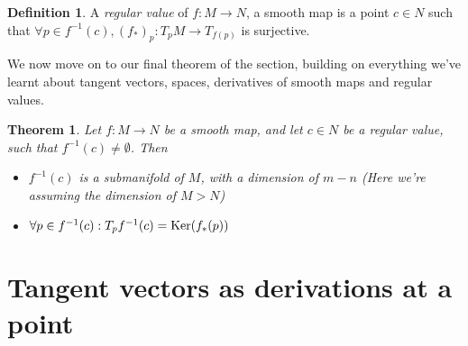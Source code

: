 \documentclass[12pt]{book}
\newtheorem{theorem}{Theorem}[chapter]
\theoremstyle{definition}
\newtheorem*{definition}{Definition}
\begin{document}
\begin{definition}
    A \textit{regular value} of $f: M \to N$, a smooth map is a point $c \in N$ such that $\forall p \in f^{-1}(c), (f_*)_p: T_pM \to T_{f(p)}$ is surjective.
\end{definition}
We now move on to our final theorem of the section, building on everything we've learnt about tangent vectors, spaces, derivatives of smooth maps and regular values.
\begin{theorem}
    Let $f: M \to N$ be a smooth map, and let $c \in N$ be a regular value, such that $f^{-1}(c) \neq \emptyset$. Then \begin{itemize}
        \item $f^{-1}(c)$ is a submanifold of $M$, with a dimension of $m - n$ (Here we're assuming the dimension of $M > N$)
        \item $\forall p \in f^{-1}(c): T_p f^{-1}(c) = \textnormal{Ker}(f_*(p))$
    \end{itemize}
\end{theorem}
\section{Tangent vectors as derivations at a point}
\end{document}
